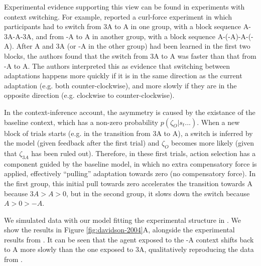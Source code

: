 \documentclass[a4paper,doc,floatsintext,natbib]{apa6}%
\def \fref #1{Figure \ref{#1}}     %
\begin{document}
Experimental evidence supporting this view can be found in experiments with context switching. For example, \cite{Davidson_Scaling_2004} reported a curl-force experiment in which participants had to switch from 3A to A in one group, with a block sequence A-3A-A-3A, and from -A to A in another group, with a block sequence A-(-A)-A-(-A). After A and 3A (or -A in the other group) had been learned in the first two blocks, the authors found that the switch from 3A to A was faster than that from -A to A. The authors interpreted this as evidence that switching between adaptations happens more quickly if it is in the same direction as the current adaptation (e.g. both counter-clockwise), and more slowly if they are in the opposite direction (e.g. clockwise to counter-clockwise).

In the context-inference account, the asymmetry is caused by the existance of the baseline context, which has a non-zero probability $p(\zeta_O | s_t ...)$. When a new block of trials starts (e.g. in the transition from 3A to A), a switch is inferred by the model (given feedback after the first trial) and $\zeta_O$ becomes more likely (given that $\zeta_{3A}$ has been ruled out). Therefore, in these first trials, action selection has a component guided by the baseline model, in which no extra compensatory force is applied, effectively ``pulling'' adaptation towards zero (no compensatory force). In the first group, this initial pull towards zero accelerates the transition towards A because $3A > A > 0$, but in the second group, it slows down the switch because $A > 0 > -A$.

We simulated data with our model fitting the experimental structure in \cite{Davidson_Scaling_2004}. We show the results in \fref{fig:davidson-2004}A, alongside the experimental results from \cite{Davidson_Scaling_2004}. It can be seen that the agent exposed to the -A context shifts back to A more slowly than the one exposed to 3A, qualitatively reproducing the data from \cite{Davidson_Scaling_2004}.
\end{document}

